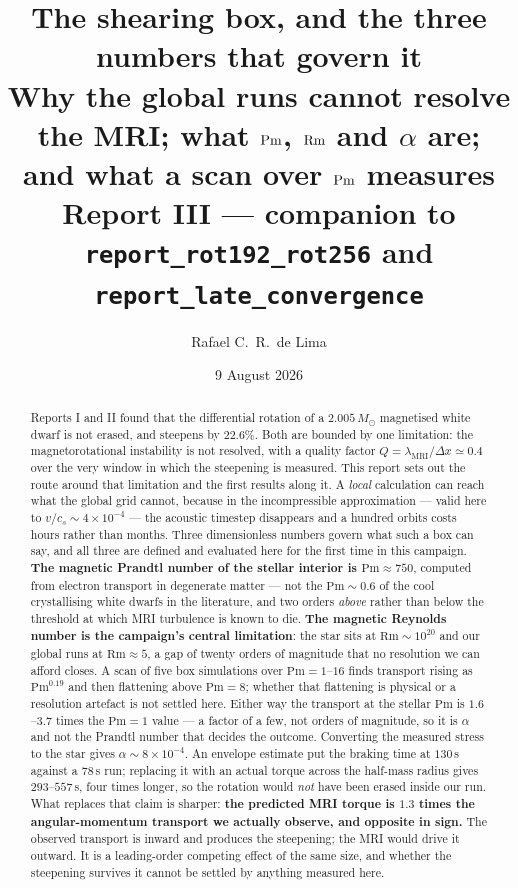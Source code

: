 \documentclass[11pt,a4paper]{article}
\title{\textbf{The shearing box, and the three numbers that govern it}\\[0.3em]
\large Why the global runs cannot resolve the MRI; what $\Pm$, $\Rm$ and
$\alpha$ are; and what a scan over $\Pm$ measures\\[0.2em]
\normalsize Report III --- companion to \texttt{report\_rot192\_rot256} and
\texttt{report\_late\_convergence}}
\author{Rafael C.\ R.\ de Lima}
\date{9 August 2026}
\newcommand{\Msun}{M_\odot}
\newcommand{\Pm}{\mathrm{Pm}}
\newcommand{\Rm}{\mathrm{Rm}}
\newcommand{\lmri}{\lambda_{\mathrm{MRI}}}
\begin{document}
\maketitle

\begin{abstract}
\noindent
Reports I and II found that the differential rotation of a $2.005\,\Msun$
magnetised white dwarf is not erased, and steepens by $22.6\%$. Both are
bounded by one limitation: the magnetorotational instability is not resolved,
with a quality factor $Q = \lmri/\Delta x \simeq 0.4$ over the very window in
which the steepening is measured. This report sets out the route around that
limitation and the first results along it. A \emph{local} calculation can reach
what the global grid cannot, because in the incompressible approximation --- valid
here to $v/c_s \sim 4\times10^{-4}$ --- the acoustic timestep disappears and a
hundred orbits costs hours rather than months. Three dimensionless numbers govern
what such a box can say, and all three are defined and evaluated here for the
first time in this campaign. \textbf{The magnetic Prandtl number of the stellar
interior is $\Pm \approx 750$}, computed from electron transport in degenerate
matter --- not the $\Pm \sim 0.6$ of the cool crystallising white dwarfs in the
literature, and two orders \emph{above} rather than below the threshold at which
MRI turbulence is known to die. \textbf{The magnetic Reynolds number is the
campaign's central limitation}: the star sits at $\Rm \sim 10^{20}$ and our
global runs at $\Rm \approx 5$, a gap of twenty orders of magnitude that no
resolution we can afford closes. A scan of five box simulations over
$\Pm = 1$--$16$ finds transport rising as $\Pm^{0.19}$ and then flattening
above $\Pm = 8$; whether that flattening is physical or a resolution artefact
is not settled here. Either way the transport at the stellar $\Pm$ is
$1.6$--$3.7$ times the $\Pm = 1$ value --- a factor of a few, not orders of
magnitude, so it is $\alpha$ and not the Prandtl number that decides the
outcome. Converting the measured stress to the star gives
$\alpha \sim 8\times10^{-4}$. An envelope estimate put the braking time at
$130$\,s against a $78$\,s run; replacing it with an actual torque across the
half-mass radius gives $293$--$557$\,s, four times longer, so the rotation would
\emph{not} have been erased inside our run. What replaces that claim is sharper:
\textbf{the predicted MRI torque is $1.3$ times the angular-momentum transport
we actually observe, and opposite in sign.} The observed transport is inward and
produces the steepening; the MRI would drive it outward. It is a leading-order
competing effect of the same size, and whether the steepening survives it cannot
be settled by anything measured here.
\end{abstract}
\end{document}

